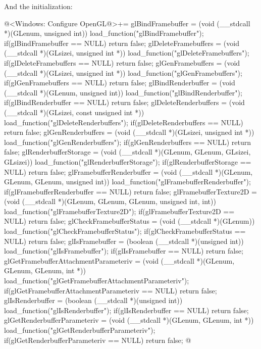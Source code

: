 And the initialization:

\iniciocodigo
@<Windows: Configure OpenGL@>+=
glBindFramebuffer = (void (__stdcall *)(GLenum, unsigned int))
                       load_function("glBindFramebuffer");
if(glBindFramebuffer == NULL) return false;
glDeleteFramebuffers = (void (__stdcall *)(GLsizei, unsigned int *))
                           load_function("glDeleteFramebuffers");
if(glDeleteFramebuffers == NULL) return false;
glGenFramebuffers = (void (__stdcall *)(GLsizei, unsigned int *))
                       load_function("glGenFramebuffers");
if(glGenFramebuffers == NULL) return false;
glBindRenderbuffer = (void (__stdcall *)(GLenum, unsigned int))
                         load_function("glBindRenderbuffer");
if(glBindRenderbuffer == NULL) return false;
glDeleteRenderbuffers = (void (__stdcall *)(GLsizei, const unsigned int *))
                           load_function("glDeleteRenderbuffers");
if(glDeleteRenderbuffers == NULL) return false;
glGenRenderbuffers = (void (__stdcall *)(GLsizei, unsigned int *))
                         load_function("glGenRenderbuffers");
if(glGenRenderbuffers == NULL) return false;
glRenderbufferStorage = (void (__stdcall *)(GLenum, GLenum, GLsizei, GLsizei))
                           load_function("glRenderbufferStorage");
if(glRenderbufferStorage == NULL) return false;
glFramebufferRenderbuffer = (void (__stdcall *)(GLenum, GLenum, GLenum,
                                                unsigned int))
                              load_function("glFramebufferRenderbuffer");
if(glFramebufferRenderbuffer == NULL) return false;
glFramebufferTexture2D = (void (__stdcall *)(GLenum, GLenum, GLenum,
                                             unsigned int, int))
                            load_function("glFramebufferTexture2D");
if(glFramebufferTexture2D == NULL) return false;
glCheckFramebufferStatus = (void (__stdcall *)(GLenum))
                               load_function("glCheckFramebufferStatus");
if(glCheckFramebufferStatus == NULL) return false;
glIsFramebuffer = (boolean (__stdcall *)(unsigned int))
                   load_function("glIsFramebuffer");
if(glIsFramebuffer == NULL) return false;
glGetFramebufferAttachmentParameteriv = (void (__stdcall *)(GLenum, GLenum,
                                                            GLenum, int *))
                        load_function("glGetFramebufferAttachmentParameteriv");
if(glGetFramebufferAttachmentParameteriv == NULL) return false;
glIsRenderbuffer = (boolean (__stdcall *)(unsigned int))
                       load_function("glIsRenderbuffer");
if(glIsRenderbuffer == NULL) return false;
glGetRenderbufferParameteriv = (void (__stdcall *)(GLenum, GLenum, int *))
                                  load_function("glGetRenderbufferParameteriv");
if(glGetRenderbufferParameteriv == NULL) return false;
@
\fimcodigo

